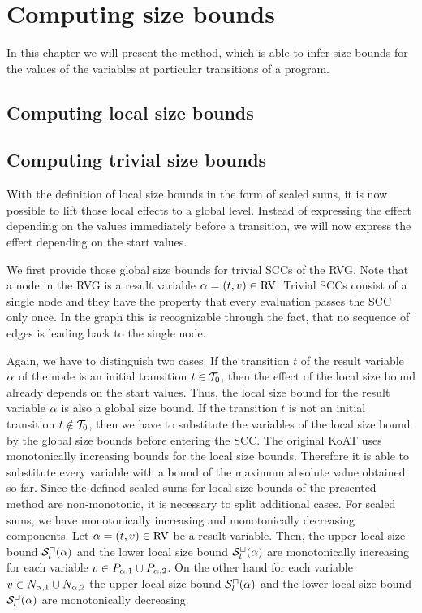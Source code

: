 \section{Computing size bounds}

In this chapter we will present the method, which is able to infer size bounds for the values of the variables at particular transitions of a program.


\subsection{Computing local size bounds}




\subsection{Computing trivial size bounds}

With the definition of local size bounds in the form of scaled sums, it is now possible to lift those local effects to a global level.
Instead of expressing the effect depending on the values immediately before a transition, we will now express the effect depending on the start values.

We first provide those global size bounds for trivial SCCs of the RVG.
Note that a node in the RVG is a result variable $\alpha = (t,v) \in \text{RV}$.
Trivial SCCs consist of a single node and they have the property that every evaluation passes the SCC only once.
In the graph this is recognizable through the fact, that no sequence of edges is leading back to the single node.

Again, we have to distinguish two cases.
If the transition $t$ of the result variable $\alpha$ of the node is an initial transition $t \in \mathcal{T}_0$, then the effect of the local size bound already depends on the start values.
Thus, the local size bound for the result variable $\alpha$ is also a global size bound.
If the transition $t$ is not an initial transition $t \notin \mathcal{T}_0$, then we have to substitute the variables of the local size bound by the global size bounds before entering the SCC.
The original KoAT uses monotonically increasing bounds for the local size bounds.
Therefore it is able to substitute every variable with a bound of the maximum absolute value obtained so far.
Since the defined scaled sums for local size bounds of the presented method are non-monotonic, it is necessary to split additional cases.
For scaled sums, we have monotonically increasing and monotonically decreasing components.
Let $\alpha = (t,v) \in \text{RV}$ be a result variable.
Then, the upper local size bound ${\mathcal{S}^\sqcap_l}(\alpha)$ and the lower local size bound ${\mathcal{S}^\sqcup_l}(\alpha)$ are monotonically increasing for each variable $v \in P_{\alpha,1} \cup P_{\alpha,2}$.
On the other hand for each variable $v \in N_{\alpha,1} \cup N_{\alpha,2}$ the upper local size bound ${\mathcal{S}^\sqcap_l}(\alpha)$ and the lower local size bound ${\mathcal{S}^\sqcup_l}(\alpha)$ are monotonically decreasing.

